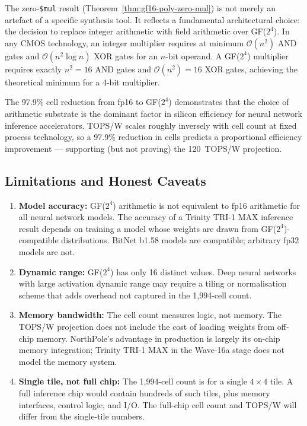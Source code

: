 The zero-\texttt{\$mul} result (Theorem~\ref{thm:gf16-poly-zero-mul}) is
not merely an artefact of a specific synthesis tool.
It reflects a fundamental architectural choice: the decision to replace
integer arithmetic with field arithmetic over GF(\(2^4\)).
In any CMOS technology, an integer multiplier requires at minimum
\(\mathcal{O}(n^2)\) AND gates and \(\mathcal{O}(n^2 \log n)\) XOR gates
for an \(n\)-bit operand.
A GF(\(2^4\)) multiplier requires exactly \(n^2 = 16\) AND gates and
\(\mathcal{O}(n^2) = 16\) XOR gates, achieving the theoretical minimum
for a 4-bit multiplier.

The 97.9\% cell reduction from fp16 to GF(\(2^4\)) demonstrates that the
choice of arithmetic substrate is the dominant factor in silicon efficiency
for neural network inference accelerators.
TOPS/W scales roughly inversely with cell count at fixed process technology,
so a 97.9\% reduction in cells predicts a proportional efficiency improvement ---
supporting (but not proving) the 120~TOPS/W projection.

\subsection{Limitations and Honest Caveats}

\begin{enumerate}
  \item \textbf{Model accuracy:} GF(\(2^4\)) arithmetic is not equivalent to
        fp16 arithmetic for all neural network models.
        The accuracy of a Trinity TRI-1 MAX inference result depends on training
        a model whose weights are drawn from GF(\(2^4\))-compatible distributions.
        BitNet b1.58 models are compatible; arbitrary fp32 models are not.

  \item \textbf{Dynamic range:} GF(\(2^4\)) has only 16 distinct values.
        Deep neural networks with large activation dynamic range may require
        a tiling or normalisation scheme that adds overhead not captured in
        the 1,994-cell count.

  \item \textbf{Memory bandwidth:} The cell count measures logic, not memory.
        The TOPS/W projection does not include the cost of loading weights
        from off-chip memory.
        NorthPole's advantage in production is largely its on-chip memory
        integration; Trinity TRI-1 MAX in the Wave-16a stage does not model
        the memory system.

  \item \textbf{Single tile, not full chip:} The 1,994-cell count is for
        a single \(4 \times 4\) tile.
        A full inference chip would contain hundreds of such tiles, plus
        memory interfaces, control logic, and I/O.
        The full-chip cell count and TOPS/W will differ from the single-tile
        numbers.
\end{enumerate}

